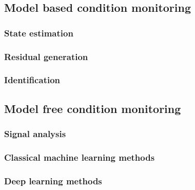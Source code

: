\begin{center}
\subsection{Model based condition monitoring}
\subsubsection{State estimation}
\subsubsection{Residual generation}
\subsubsection{Identification}

\subsection{Model free condition monitoring}
\subsubsection{Signal analysis}
\subsubsection{Classical machine learning methods}
\subsubsection{Deep learning methods}	
	
\end{center}